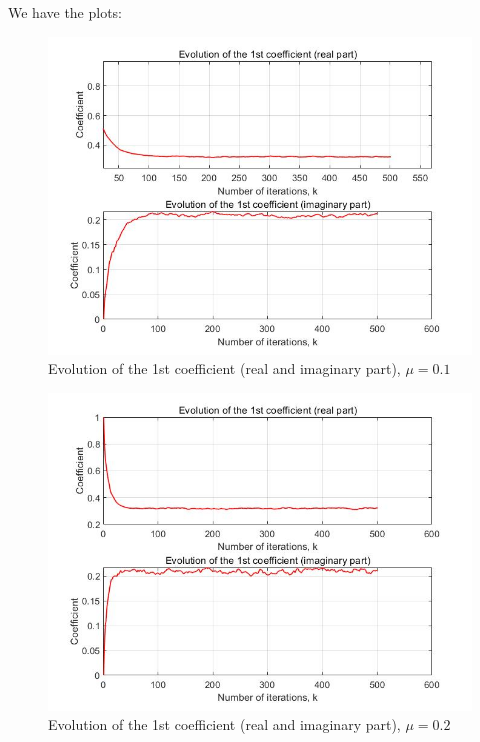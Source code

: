 \documentclass[UTF-8, a4paper, 12pt]{ctexart}
\begin{document}
We have the plots:
\begin{figure}[htbp]
    \centering
    \includegraphics[width=13cm]{3.26/mu1_coefficient.jpg}
    \caption{Evolution of the 1st coefficient (real and imaginary part), $\mu=0.1$}
\end{figure}
\begin{figure}[htbp]
    \centering
    \includegraphics[width=13cm]{3.26/mu2_coefficient.jpg}
    \caption{Evolution of the 1st coefficient (real and imaginary part), $\mu=0.2$}
\end{figure}
\end{document}
